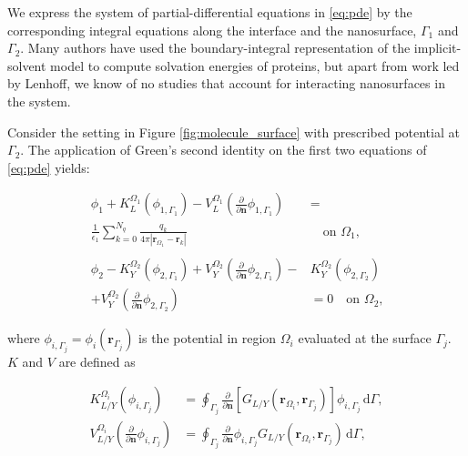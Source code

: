 


We express the system of partial-differential equations in  \eqref{eq:pde} by the corresponding integral equations along the interface and the nanosurface, $\Gamma_1$ and $\Gamma_2$. Many authors have used the boundary-integral representation of the implicit-solvent model to compute solvation energies of proteins,\cite{YoonLenhoff1990, Juffer1991a, LuETal2006, BajajETal2011, AltmanBardhanWhiteTidor09, GengKrasny2013, CooperBardhanBarba2013} but apart from work led by Lenhoff,\cite{YoonLenhoff1992} we know of no studies that account for interacting nanosurfaces in the system. 

Consider the setting in Figure \ref{fig:molecule_surface} with prescribed potential at $\Gamma_2$. The application of Green's second identity on the first two equations of \eqref{eq:pde} yields:

\begin{align} \label{eq:green_identity}
\phi_{1}+ K_{L}^{\Omega_1}(\phi_{1,\Gamma_1}) -  V_{L}^{\Omega_1} \left(\frac{\partial}{\partial \mathbf{n}}  \phi_{1,\Gamma_1}  \right) &  = \nonumber\\
 \frac{1}{\epsilon_1} \sum_{k=0}^{N_q}  \frac{q_k}{4\pi|\mathbf{r}_{\Omega_1} - \mathbf{r}_k|} &  \quad \text{on $\Omega_1$,} \nonumber \\ \nonumber \\
\phi_{2} - K_{Y}^{\Omega_2}(\phi_{2,\Gamma_1}) + V_{Y}^{\Omega_2} \left( \frac{\partial}{\partial \mathbf{n}} \phi_{2,\Gamma_1} \right) - & K_{Y}^{\Omega_2}(\phi_{2,\Gamma_2})  \nonumber \\
 + V_{Y}^{\Omega_2}  \left( \frac{\partial}{\partial \mathbf{n}} \phi_{2,\Gamma_2} \right) & = 0 \quad \text{on $\Omega_2$,}
\end{align}

\noindent where $\phi_{i,\Gamma_j} = \phi_i(\mathbf{r}_{\Gamma_j})$ is the potential in region $\Omega_i$ evaluated at the surface $\Gamma_j$. $K$ and $V$ are defined as

%
\begin{align} \label{eq:layers}
K_{L/Y}^{\Omega_i}(\phi_{i,\Gamma_j}) &= \oint_{\Gamma_j} \frac{\partial}{\partial \mathbf{n}} \left[ G_{L/Y}(\mathbf{r}_{\Omega_i},\mathbf{r}_{\Gamma_j}) \right]\phi_{i,\Gamma_j} \, \mathrm{d} \Gamma, \nonumber \\
V_{L/Y}^{\Omega_i} \left( \frac{\partial}{\partial \mathbf{n}} \phi_{i,\Gamma_j} \right) &= \oint_{\Gamma_j} \frac{\partial}{\partial \mathbf{n}} \phi_{i,\Gamma_j} G_{L/Y}(\mathbf{r}_{\Omega_i},\mathbf{r}_{\Gamma_j})  \, \mathrm{d} \Gamma,
\end{align}

